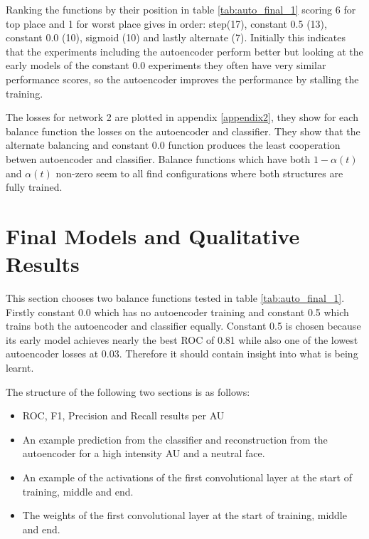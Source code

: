           Ranking the functions by their position in table \ref{tab:auto_final_1} scoring 6 for top place and 1 for worst place gives in order:
          step(17), constant 0.5 (13), constant 0.0 (10), sigmoid (10) and lastly alternate (7). Initially this indicates that the
          experiments including the autoencoder perform better but looking at the early models of the constant 0.0 experiments
          they often have very similar performance scores, so the autoencoder improves the performance by stalling the training.

          The losses for network 2 are plotted in appendix \ref{appendix2}, they show for each
          balance function the losses on the autoencoder and classifier.
          They show that the alternate balancing and constant 0.0
          function produces the least cooperation betwen autoencoder and classifier.
          Balance functions which have both $1-\alpha(t)$ and $\alpha(t)$ non-zero
          seem to all find configurations where both structures are fully trained.


    \section{Final Models and Qualitative Results}

      This section chooses two balance functions tested in table \ref{tab:auto_final_1}.
      Firstly constant 0.0 which has no autoencoder training and constant 0.5 which trains
      both the autoencoder and classifier equally. Constant 0.5 is chosen because its early
      model achieves nearly the best ROC of 0.81 while also one of the lowest autoencoder losses
      at 0.03. Therefore it should contain insight into what is being learnt.

      The structure of the following two sections is as follows:
      \begin{itemize}
        \item ROC, F1, Precision and Recall results per AU
        \item An example prediction from the classifier and reconstruction from the autoencoder for a high intensity AU and a neutral face.
        \item An example of the activations of the first convolutional layer at the start of training, middle and end.
        \item The weights of the first convolutional layer at the start of training, middle and end.
      \end{itemize}

